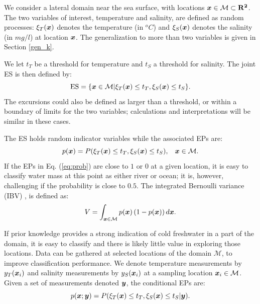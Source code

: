 \documentclass[aoas]{imsart}
\begin{document}
We consider a lateral domain near the sea surface, with locations
${\boldsymbol x} \in \mathcal{M} \subset \mathbf{R^2}$. The two variables of
interest, temperature and salinity, are defined as random processes:
$\xi_T({\boldsymbol x})$ denotes the temperature (in $^o C$) and $\xi_S({\boldsymbol x})$
denotes the salinity (in $mg/l$) at location ${\boldsymbol x}$. The generalization to more than two variables is given in Section \ref{gen_k}. 

We let $t_T$ be a threshold for temperature and $t_S$ a threshold for salinity. The joint ES is then defined by:
\begin{equation}\label{ES}
     \mbox{ES} = \{\bx \in \mathcal{M} | \xi_T(\bx) \leq t_T,\xi_S(\bx) \leq t_S\}.
\end{equation}
The excursions could also be defined as larger than a threshold, or
within a boundary of limits for the two variables; calculations and
interpretations will be similar in these cases.

The ES holds random indicator variables while the associated EPs are: 
\begin{equation}\label{eq:prob}
  p(\bx) = P(\xi_T(\bx) \leq t_T, \xi_S(\bx) \leq t_S), \hspace{3mm} \bx \in \mathcal{M}.
\end{equation}
If the EPs in Eq. (\ref{eq:prob}) are
close to $1$ or $0$ at a given location, it is easy to classify water mass at this point as either river or ocean; it is, however,
challenging if the probability is close to $0.5$. 
The integrated Bernoulli variance (IBV) \cite{bect2019}, is defined as: 
\begin{equation}\label{measVAR}
    V = \int_{\bx \in \mathcal{M}} p(\bx) \left(1-p(\bx)\right) d\bx.
\end{equation}

If prior knowledge provides a strong indication of cold freshwater
 in a part of the domain, it is easy to classify and
there is likely little value in exploring those locations. Data can be
gathered at selected locations of the domain $\mathcal{M}$, to improve
classification performance. We denote temperature measurements by
$y_{T}({\boldsymbol x}_i)$ and salinity measurements by $y_{S}({\boldsymbol x}_i)$ at a
sampling location ${\boldsymbol x}_i \in \mathcal{M}$. Given a set of
measurements denoted ${\boldsymbol y}$, the conditional EPs are:
\begin{equation}\label{eq:post_ep}
 p(\bx;\by) = P(\xi_T(\bx) \leq t_T, \xi_S(\bx) \leq t_S |\by). 
\end{equation}
\end{document}
